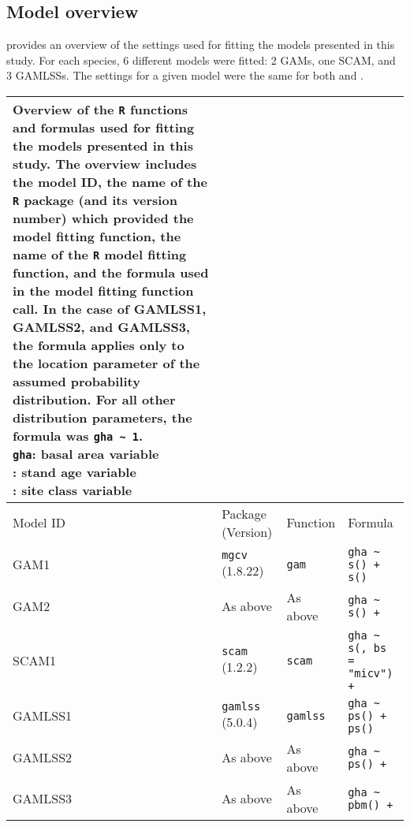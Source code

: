 \subsection{Model overview}

 provides an overview of the settings used for fitting the models presented in this study.  For each species, 6 different models were fitted: 2 GAMs, one SCAM, and 3 GAMLSSs.  The settings for a given model were the same for both \Beech{} and \Spruce{}.

\begin{table}[H]
  {\tabulinesep=2mm
    \begin{longtabu}{l l l L}
      \caption{Overview of the \texttt{R} functions and formulas used for fitting the models presented in this study. The overview includes
        the model ID,
        the name of the \texttt{R} package (and its version number) which provided the model fitting function,
        the name of the \texttt{R} model fitting function,
        and the formula used in the model fitting function call.
        In the case of GAMLSS1, GAMLSS2, and GAMLSS3, the formula applies only to the location parameter of the assumed probability distribution.
        For all other distribution parameters, the formula was \texttt{gha \textasciitilde{} 1}. \\
        \texttt{gha}: basal area variable \\
        \StandAgeVariableR{}: stand age variable \\
        \SiteClassVariableR{}: site class variable
        \label{tab:PresentedModelsOverviewFormulas}} \\
      \toprule
      Model ID & Package (Version) & Function & Formula \\
      \midrule
      \endhead
      \bottomrule
      \endlastfoot
      GAM1 & \texttt{mgcv} (1.8.22) & \texttt{gam} & \texttt{gha \textasciitilde{} s(\StandAgeVariableR{}) + s(\SiteClassVariableR{})} \\
      GAM2 & As above & As above & \texttt{gha \textasciitilde{} s(\StandAgeVariableR{}) + \SiteClassVariableR{}} \\
      SCAM1 & \texttt{scam} (1.2.2) & \texttt{scam} & \texttt{gha \textasciitilde{} s(\StandAgeVariableR{}, bs = "micv") + \SiteClassVariableR{}} \\
      GAMLSS1 & \texttt{gamlss} (5.0.4) & \texttt{gamlss} & \texttt{gha \textasciitilde{} ps(\StandAgeVariableR{}) + ps(\SiteClassVariableR{})} \\
      GAMLSS2 & As above & As above & \texttt{gha \textasciitilde{} ps(\StandAgeVariableR{}) + \SiteClassVariableR{}} \\
      GAMLSS3 & As above & As above & \texttt{gha \textasciitilde{} pbm(\StandAgeVariableR{}) + \SiteClassVariableR{}} \\
      \bottomrule
    \end{longtabu}}
\end{table}

